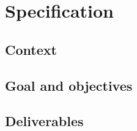 \documentclass[../report.tex]{subfiles}
\begin{document}
\chapter{Specification}
\section*{Context}

\section*{Goal and objectives}

\section*{Deliverables}
\end{document}
